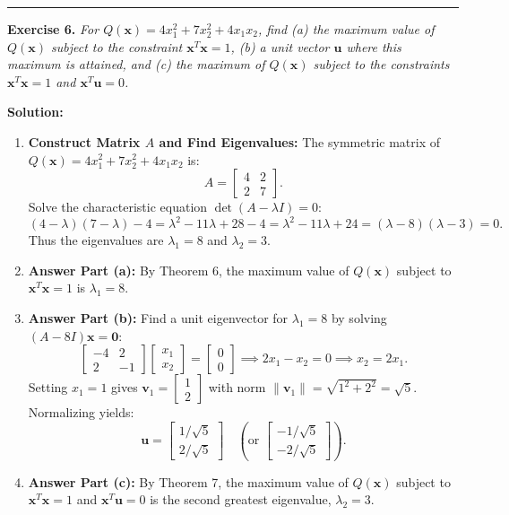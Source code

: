 \documentclass[11pt, letterpaper]{article}
\theoremstyle{definition}
\theoremstyle{remark}
\begin{document}
\medskip
\hrule
\medskip

\textbf{Exercise 6.} \emph{For $Q(\mathbf{x}) = 4x_1^2 + 7x_2^2 + 4x_1x_2$, find (a) the maximum value of $Q(\mathbf{x})$ subject to the constraint $\mathbf{x}^T\mathbf{x} = 1$, (b) a unit vector $\mathbf{u}$ where this maximum is attained, and (c) the maximum of $Q(\mathbf{x})$ subject to the constraints $\mathbf{x}^T\mathbf{x} = 1$ and $\mathbf{x}^T\mathbf{u} = 0$.}

\textbf{Solution:}
\begin{enumerate}[label=\textbf{Step \arabic*:}]
    \item \textbf{Construct Matrix $A$ and Find Eigenvalues:}
    The symmetric matrix of $Q(\mathbf{x}) = 4x_1^2 + 7x_2^2 + 4x_1x_2$ is:
    \[
    A = \begin{bmatrix} 4 & 2 \\ 2 & 7 \end{bmatrix}.
    \]
    Solve the characteristic equation $\det(A - \lambda I) = 0$:
    \[
    (4 - \lambda)(7 - \lambda) - 4 = \lambda^2 - 11\lambda + 28 - 4 = \lambda^2 - 11\lambda + 24 = (\lambda - 8)(\lambda - 3) = 0.
    \]
    Thus the eigenvalues are $\lambda_1 = 8$ and $\lambda_2 = 3$.
    \item \textbf{Answer Part (a):}
    By Theorem 6, the maximum value of $Q(\mathbf{x})$ subject to $\mathbf{x}^T\mathbf{x} = 1$ is $\lambda_1 = 8$.
    \item \textbf{Answer Part (b):}
    Find a unit eigenvector for $\lambda_1 = 8$ by solving $(A - 8I)\mathbf{x} = \mathbf{0}$:
    \[
    \begin{bmatrix} -4 & 2 \\ 2 & -1 \end{bmatrix} \begin{bmatrix} x_1 \\ x_2 \end{bmatrix} = \begin{bmatrix} 0 \\ 0 \end{bmatrix} \implies 2x_1 - x_2 = 0 \implies x_2 = 2x_1.
    \]
    Setting $x_1 = 1$ gives $\mathbf{v}_1 = \begin{bmatrix} 1 \\ 2 \end{bmatrix}$ with norm $\|\mathbf{v}_1\| = \sqrt{1^2 + 2^2} = \sqrt{5}$. Normalizing yields:
    \[
    \mathbf{u} = \begin{bmatrix} 1/\sqrt{5} \\ 2/\sqrt{5} \end{bmatrix} \quad \left(\text{or } \begin{bmatrix} -1/\sqrt{5} \\ -2/\sqrt{5} \end{bmatrix}\right).
    \]
    \item \textbf{Answer Part (c):}
    By Theorem 7, the maximum value of $Q(\mathbf{x})$ subject to $\mathbf{x}^T\mathbf{x} = 1$ and $\mathbf{x}^T\mathbf{u} = 0$ is the second greatest eigenvalue, $\lambda_2 = 3$.
\end{enumerate}
\end{document}
